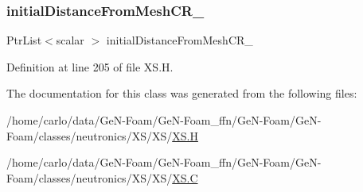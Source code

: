 \subsubsection{\texorpdfstring{initial\+Distance\+From\+Mesh\+C\+R\+\_\+}{initialDistanceFromMeshCR\_}}
{\footnotesize\ttfamily Ptr\+List$<$scalar $>$ initial\+Distance\+From\+Mesh\+C\+R\+\_\+\hspace{0.3cm}{\ttfamily [protected]}}



Definition at line 205 of file X\+S.\+H.



The documentation for this class was generated from the following files\+:\begin{DoxyCompactItemize}
\item 
/home/carlo/data/\+Ge\+N-\/\+Foam/\+Ge\+N-\/\+Foam\+\_\+ffn/\+Ge\+N-\/\+Foam/\+Ge\+N-\/\+Foam/classes/neutronics/\+X\+S/\+X\+S/\hyperlink{XS_8H}{X\+S.\+H}\item 
/home/carlo/data/\+Ge\+N-\/\+Foam/\+Ge\+N-\/\+Foam\+\_\+ffn/\+Ge\+N-\/\+Foam/\+Ge\+N-\/\+Foam/classes/neutronics/\+X\+S/\+X\+S/\hyperlink{XS_8C}{X\+S.\+C}\end{DoxyCompactItemize}
